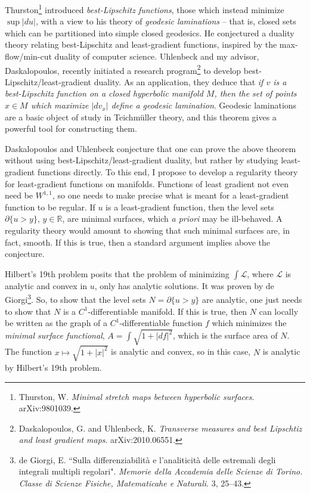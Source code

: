 \documentclass[12pt]{article}
\begin{document}
Thurston\footnote{Thurston, W. \emph{Minimal stretch maps between hyperbolic surfaces}. arXiv:9801039.} introduced \emph{best-Lipschitz functions}, those which instead minimize $\sup |du|$, with a view to his theory of \emph{geodesic laminations} -- that is, closed sets which can be partitioned into simple closed geodesics.
He conjectured a duality theory relating best-Lipschitz and least-gradient functions, inspired by the max-flow/min-cut duality of computer science.
Uhlenbeck and my advisor, Daskalopoulos, recently initiated a research program\footnote{Daskalopoulos, G. and Uhlenbeck, K. \emph{Transverse measures and best Lipschtiz and least gradient maps}. arXiv:2010.06551.} to develop best-Lipschitz/least-gradient duality.
As an application, they deduce that \emph{if $v$ is a best-Lipschitz function on a closed hyperbolic manifold $M$, then the set of points $x \in M$ which maximize $|dv_x|$ define a geodesic lamination}.
Geodesic laminations are a basic object of study in Teichm\"uller theory, and this theorem gives a powerful tool for constructing them.

Daskalopoulos and Uhlenbeck conjecture that one can prove the above theorem without using best-Lipschitz/least-gradient duality, but rather by studying least-gradient functions directly.
To this end, I propose to develop a regularity theory for least-gradient functions on manifolds.
Functions of least gradient not even need be $W^{1, 1}$, so one needs to make precise what is meant for a least-gradient function to be regular.
If $u$ is a least-gradient function, then the level sets $\partial \{u > y\}$, $y \in \mathbb R$, are minimal surfaces, which \emph{a priori} may be ill-behaved.
A regularity theory would amount to showing that such minimal surfaces are, in fact, smooth.
If this is true, then a standard argument implies above the conjecture.

Hilbert's 19th problem posits that the problem of minimizing $\int \mathscr L$, where $\mathscr L$ is analytic and convex in $u$, only has analytic solutions.
It was proven by de Giorgi\footnote{de Giorgi, E. ``Sulla differenziabilità e l'analiticità delle estremali degli integrali multipli regolari". \emph{Memorie della Accademia delle Scienze di Torino. Classe di Scienze Fisiche, Matematicahe e Naturali}. 3, 25--43.}.
So, to show that the level sets $N = \partial \{u > y\}$ are analytic, one just needs to show that $N$ is a $C^1$-differentiable manifold.
If this is true, then $N$ can locally be written as the graph of a $C^1$-differentiable function $f$ which minimizes the \emph{minimal surface functional}, $A = \int \sqrt{1 + |df|^2}$, which is the surface area of $N$.
The function $x \mapsto \sqrt{1 + |x|^2}$ is analytic and convex, so in this case, $N$ is analytic by Hilbert's 19th problem.
\end{document}

